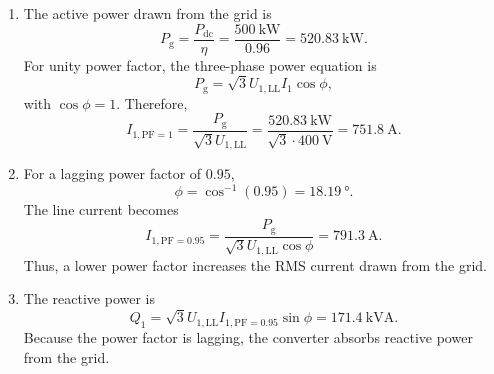 \begin{solutionblock}
	\renewcommand{\labelenumi}{\alph{enumi})}
	\begin{enumerate}
		\item The active power drawn from the grid is
		      $$P_{\mathrm{g}} = \frac{P_{\mathrm{dc}}}{\eta} = \frac{\SI{500}{\kilo\watt}}{0.96} = \SI{520.83}{\kilo\watt}.$$
		      For unity power factor, the three-phase power equation is
		      $$P_{\mathrm{g}} = \sqrt{3}U_{1,\mathrm{LL}}I_1\cos\phi,$$
		      with $\cos\phi = 1$. Therefore,
		      $$I_{1,\mathrm{PF}=1} = \frac{P_{\mathrm{g}}}{\sqrt{3}U_{1,\mathrm{LL}}}
			      = \frac{\SI{520.83}{\kilo\watt}}{\sqrt{3}\cdot \SI{400}{\volt}}
			      = \SI{751.8}{\ampere}.$$
		\item For a lagging power factor of $0.95$,
		      $$\phi = \cos^{-1}(0.95) = \SI{18.19}{\degree}.$$
		      The line current becomes
		      $$I_{1,\mathrm{PF}=0.95} = \frac{P_{\mathrm{g}}}{\sqrt{3}U_{1,\mathrm{LL}}\cos\phi}
			      = \SI{791.3}{\ampere}.$$
		      Thus, a lower power factor increases the RMS current drawn from the grid.
		\item The reactive power is
		      $$Q_1 = \sqrt{3}U_{1,\mathrm{LL}}I_{1,\mathrm{PF}=0.95}\sin\phi
			      = \SI{171.4}{\kilo\volt\ampere}.$$
		      Because the power factor is lagging, the converter absorbs reactive power from the grid.
	\end{enumerate}
\end{solutionblock}
